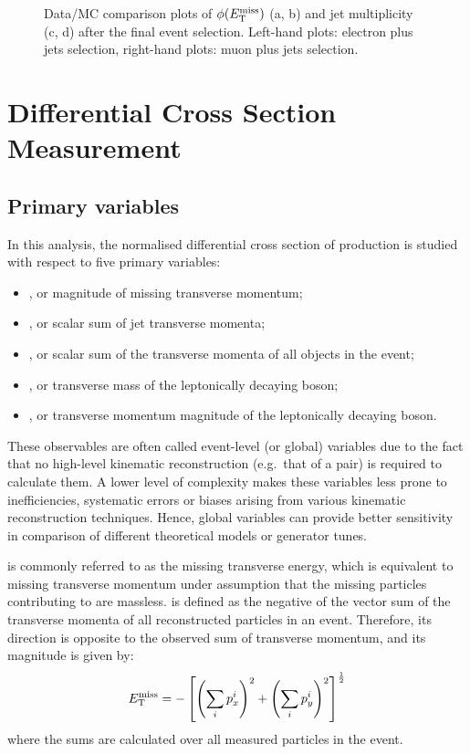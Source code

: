\begin{figure}[htbp]
    \caption[Data/MC comparison plots of $\phi(\MET)$ and jet multiplicity after the final event selection]{Data/MC
    comparison plots of $\phi(\MET)$ (a, b) and jet multiplicity (c, d) after the final event selection. Left-hand
    plots: electron plus jets selection, right-hand plots: muon plus jets selection.}
    \label{fig:contol_plots_phiMET_NJets}
\end{figure}

\newpage

\section{Differential Cross Section Measurement}
\label{s_xsection:measurement}

\subsection{Primary variables}
\label{ss_xsection:variables}

In this analysis, the normalised differential cross section of \ttbar production is studied with respect to five primary
variables:

\begin{itemize}
	\item \MET, or magnitude of missing transverse momentum;
	\item \HT, or scalar sum of jet transverse momenta;
	\item \ST, or scalar sum of the transverse momenta of all objects in the event;
	\item \MT, or transverse mass of the leptonically decaying \W boson;
	\item \WPT, or transverse momentum magnitude of the leptonically decaying \W boson.
\end{itemize}

These observables are often called event-level (or global) variables due to the fact that no high-level kinematic
reconstruction (e.g.\ that of a \ttbar pair) is required to calculate them. A lower level of complexity makes these
variables less prone to inefficiencies, systematic errors or biases arising from various kinematic reconstruction
techniques. Hence, global variables can provide better sensitivity in comparison of different theoretical models or
generator tunes.

\METvec is commonly referred to as the missing transverse energy, which is equivalent to missing transverse momentum
under assumption that the missing particles contributing to \METvec are massless. \METvec is defined as the negative of
the vector sum of the transverse momenta of all reconstructed particles in an event. Therefore, its direction is
opposite to the observed sum of transverse momentum, and its magnitude \MET is given by:
\[ E_{\mathrm{T}}^{\textrm{miss}} = - \left[ \left(\sum_i{p_{x}^i}\right)^2 + \left(\sum_i{p_{y}^i}\right)^2 \right]^{\frac{1}{2}}\]
where the sums are calculated over all measured particles in the event.

